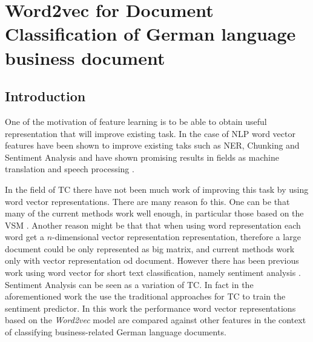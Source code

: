 \chapter{Word2vec for Document Classification of German language business document}
\label{chap:rel_word2vec_doc_classification}


\section{Introduction}
\label{sec:w2v4tc_intro}

One of the motivation of feature learning is to be able to
obtain useful representation that will improve existing task. In the case of
\ac{NLP} word vector features have been shown to improve existing taks such
as \ac{NER}, Chunking and Sentiment Analysis \cite{Turian:2010:WRS:1858681.1858721}
\cite{DBLP:journals/corr/abs-1103-0398}  and have shown promising results in
fields as machine translation and speech processing \cite{collobert:2008}
\cite{DBLP:journals/corr/MikolovLS13}.  

In the field of \ac{TC} there have
not been much work of improving this task by using word vector representations. There are many reason
fo this. One can be that many of the current methods work well enough, in particular those
based on the \ac{VSM} \cite{Sebastiani02}. Another reason might be that that
when using word representation each word get a $n$-dimensional vector
representation representation, therefore a large document could be only
represented as big matrix,  and current methods work only with vector
representation od document. However there has been previous work using word
vector for short text classification, namely sentiment analysis
\cite{maas2011learning} . Sentiment Analysis can be seen as a variation of
\ac{TC}. In fact in the aforementioned work the use the traditional
approaches for \ac{TC} to train the sentiment predictor.  In this work the
performance  word vector representations based on the \textit{Word2vec} model 
are compared against other features in the context of classifying  business-related German language
documents. 

